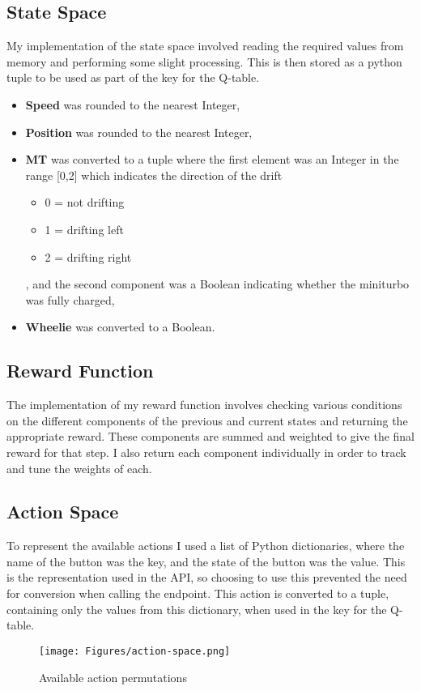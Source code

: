 \subsection{State Space}
My implementation of the state space involved reading the required values from memory and performing some slight processing. This is then stored as a python tuple to be used as part of the key for the Q-table.
\begin{itemize}
    \item \textbf{Speed} was rounded to the nearest Integer,
    \item \textbf{Position} was rounded to the nearest Integer,
    \item \textbf{MT} was converted to a tuple where the first element was an Integer in the range [0,2] which indicates the direction of the drift \begin{itemize}
        \item 0 = not drifting
        \item 1 = drifting left
        \item 2 = drifting right
    \end{itemize}
    , and the second component was a Boolean indicating whether the miniturbo was fully charged,
    \item \textbf{Wheelie} was converted to a Boolean.
\end{itemize}
\subsection{Reward Function}
The implementation of my reward function involves checking various conditions on the different components of the previous and current states and returning the appropriate reward. These components are summed and weighted to give the final reward for that step. I also return each component individually in order to track and tune the weights of each. 
\subsection{Action Space}
To represent the available actions I used a list of Python dictionaries, where the name of the button was the key, and the state of the button was the value. This is the representation used in the API, so choosing to use this prevented the need for conversion when calling the endpoint. This action is converted to a tuple, containing only the values from this dictionary, when used in the key for the Q-table.
\begin{figure}[hbt]
    \centering
    \texttt{[image: Figures/action-space.png]}
    \caption{Available action permutations}
    \label{fig:action-space}
\end{figure}

